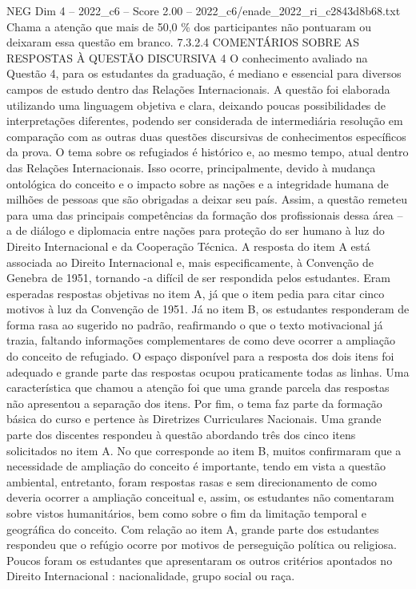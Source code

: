 \begin{textsample}{NEG Dim 4 – 2022\_c6 – Score 2.00 – 2022\_c6/enade\_2022\_ri\_c2843d8b68.txt}
Chama a atenção que mais de 50,0 \% dos participantes não pontuaram ou deixaram essa questão em branco. 7.3.2.4 COMENTÁRIOS SOBRE AS RESPOSTAS À QUESTÃO DISCURSIVA 4 O conhecimento avaliado na Questão 4, para os estudantes da graduação, é mediano e essencial para diversos campos de estudo dentro das Relações Internacionais.
A questão foi elaborada utilizando uma linguagem objetiva e clara, deixando poucas possibilidades de interpretações diferentes, podendo ser considerada de intermediária resolução em comparação com as outras duas questões discursivas de conhecimentos específicos da prova.
O tema sobre os refugiados é histórico e, ao mesmo tempo, atual dentro das Relações Internacionais.
Isso ocorre, principalmente, devido à mudança ontológica do conceito e o impacto sobre as nações e a integridade humana de milhões de pessoas que são obrigadas a deixar seu país.
Assim, a questão remeteu para uma das principais competências da formação dos profissionais dessa área – a de diálogo e diplomacia entre nações para proteção do ser humano à luz do Direito Internacional e da Cooperação Técnica.
A resposta do item A está associada ao Direito Internacional e, mais especificamente, à Convenção de Genebra de 1951, tornando -a difícil de ser respondida pelos estudantes.
Eram esperadas respostas objetivas no item A, já que o item pedia para citar cinco motivos à luz da Convenção de 1951.
Já no item B, os estudantes responderam de forma rasa ao sugerido no padrão, reafirmando o que o texto motivacional já trazia, faltando informações complementares de como deve ocorrer a ampliação do conceito de refugiado.
O espaço disponível para a resposta dos dois itens foi adequado e grande parte das respostas ocupou praticamente todas as linhas.
Uma característica que chamou a atenção foi que uma grande parcela das respostas não apresentou a separação dos itens.
Por fim, o tema faz parte da formação básica do curso e pertence às Diretrizes Curriculares Nacionais.
Uma grande parte dos discentes respondeu à questão abordando três dos cinco itens solicitados no item A.
No que corresponde ao item B, muitos confirmaram que a necessidade de ampliação do conceito é importante, tendo em vista a questão ambiental, entretanto, foram respostas rasas e sem direcionamento de como deveria ocorrer a ampliação conceitual e, assim, os estudantes não comentaram sobre vistos humanitários, bem como sobre o fim da limitação temporal e geográfica do conceito.
Com relação ao item A, grande parte dos estudantes respondeu que o refúgio ocorre por motivos de perseguição política ou religiosa.
Poucos foram os estudantes que apresentaram os outros critérios apontados no Direito Internacional : nacionalidade, grupo social ou raça.

\end{textsample}
